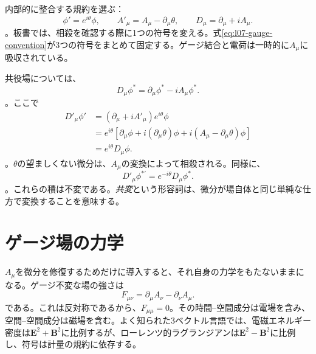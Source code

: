 内部的に整合する規約を選ぶ：\begin{equation}
  \phi'=e^{i\theta}\phi,
  \qquad
  A'_\mu=A_\mu-\partial_\mu\theta,
  \qquad
  D_\mu=\partial_\mu+iA_\mu.
  \label{eq:l07-gauge-convention}
\end{equation}。板書では、相殺を確認する際に1つの符号を変える。式\eqref{eq:l07-gauge-convention}が3つの符号をまとめて固定する。ゲージ結合と電荷は一時的に\(A_\mu\)に吸収されている。

共役場については、\begin{equation}
  D_\mu\phi^*=\partial_\mu\phi^*-iA_\mu\phi^*.
\end{equation}。ここで\begin{align}
  D'_\mu\phi'
  &=
  \left(\partial_\mu+iA'_\mu\right)e^{i\theta}\phi
  \nonumber\\
  &=
  e^{i\theta}
  \left[
    \partial_\mu\phi+i(\partial_\mu\theta)\phi
    +i(A_\mu-\partial_\mu\theta)\phi
  \right]
  \nonumber\\
  &=e^{i\theta}D_\mu\phi.
  \label{eq:l07-covariant-transform}
\end{align}。\(\theta\)の望ましくない微分は、\(A_\mu\)の変換によって相殺される。同様に、\begin{equation}
  D'_\mu\phi^{*\prime}=e^{-i\theta}D_\mu\phi^*.
\end{equation}。これらの積は不変である。\emph{共変}という形容詞は、微分が場自体と同じ単純な仕方で変換することを意味する。

\section{ゲージ場の力学}

\(A_\mu\)を微分を修復するためだけに導入すると、それ自身の力学をもたないままになる。ゲージ不変な場の強さは\begin{equation}
  F_{\mu\nu}
  =\partial_\mu A_\nu-\partial_\nu A_\mu.
  \label{eq:l07-field-strength}
\end{equation}である。これは反対称であるから、\(F_{\mu\mu}=0\)。その時間--空間成分は電場を含み、空間--空間成分は磁場を含む。よく知られた3ベクトル言語では、電磁エネルギー密度は\(\bm E^2+\bm B^2\)に比例するが、ローレンツ的ラグランジアンは\(\bm E^2-\bm B^2\)に比例し、符号は計量の規約に依存する。

\begin{classroomqa}
\end{classroomqa}

